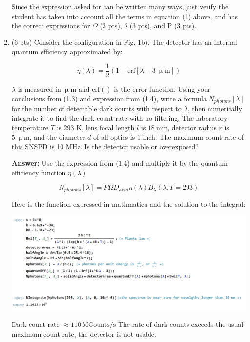 \documentclass[12pt]{caltech_thesis}
\begin{document}
\begin{enumerate}
{  }

  {\color{midnightblue}  Since the expression asked for can be written
  many ways, just verify the student has taken into account all the
  terms in equation (1) above, and has the correct expressions for}
  {\color{darkred} \(\Omega\) (3 pts), \(\theta\) (3 pts), and P (3
  pts).}
\item
  (6 pts) Consider the configuration in Fig. 1b). The detector has an
  internal quantum efficiency approximated by:

  \[\eta(\lambda) = \frac{1}{2}(1 - \text{erf}[\lambda - 3~\mathrm{\upmu m}]) \]

  \(\lambda\) is measured in \(\mathrm{\upmu m}\) and \(\text{erf}()\)
  is the error function. Using your conclusions from (1.3) and
  expression from (1.4), write a formula \(N_{photons}[\lambda]\) for
  the number of detectable dark counts with respect to \(\lambda\), then
  numerically integrate it to find the dark count rate with no
  filtering. The laboratory temperature \(T\) is 293 K, lens focal
  length \(l\) is \(18~\text{mm}\), detector radius \(r\) is
  \(5~\mathrm{\upmu m}\), and the diameter \(d\) of all optics is 1
  inch. The maximum count rate of this SNSPD is 10 MHz. Is the detector
  usable or overexposed?

  {\color{midnightblue}  \textbf{Answer:} } {\color{midnightblue} Use
  the expression from (1.4) and multiply it by the quantum efficiency
  function \(\eta(\lambda)\) }

  {\color{midnightblue} 

  \[N_{photons}[\lambda] = P \Omega D_{area} \eta(\lambda) B_{\lambda}(\lambda, T=293)\]

  }

  {\color{midnightblue}  Here is the function expressed in mathmatica
  and the solution to the integral: }

  {\color{midnightblue} \includegraphics{chapter_05/figs_05/mathematica_2.PNG}}

  {\color{midnightblue} Dark count rate
  \(\approx \boxed{110 \,\text{MCounts/s}}\) } {\color{midnightblue} The
  rate of dark counts exceeds the usual maximum count rate, the detector
  is not usable. }


\end{enumerate}
\end{document}
